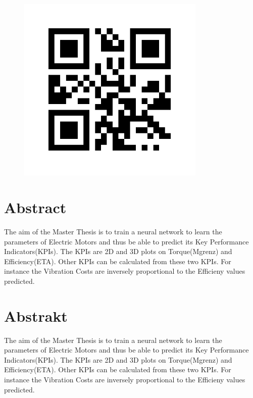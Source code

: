 \documentclass[a4paper,12pt]{article}
\begin{document}
\begin{figure}[h]
    \includegraphics[width=0.8\textwidth]{./ReportImages/qrcode.png} %
    \label{fig:your-image}
\end{figure}

\newpage %

\section*{Abstract}
The aim of the Master Thesis is to train a neural network to learn the parameters of Electric Motors and thus be able to predict its Key Performance Indicators(KPIs).
The KPIs are 2D and 3D plots on Torque(Mgrenz) and Efficiency(ETA). Other KPIs can be calculated from these two KPIs.
For instance the Vibration Costs are inversely proportional to the Efficieny values predicted. 

\section*{Abstrakt}
The aim of the Master Thesis is to train a neural network to learn the parameters of Electric Motors and thus be able to predict its Key Performance Indicators(KPIs).
The KPIs are 2D and 3D plots on Torque(Mgrenz) and Efficiency(ETA). Other KPIs can be calculated from these two KPIs.
For instance the Vibration Costs are inversely proportional to the Efficieny values predicted. 

\newpage 
\end{document}
